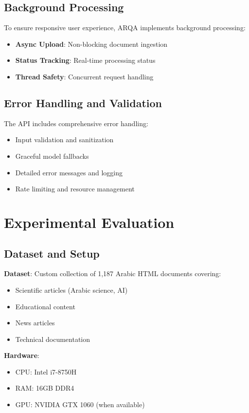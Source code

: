 \documentclass[conference]{IEEEtran}
\begin{document}
\subsection{Background Processing}
To ensure responsive user experience, ARQA implements background processing:
\begin{itemize}
    \item \textbf{Async Upload}: Non-blocking document ingestion
    \item \textbf{Status Tracking}: Real-time processing status
    \item \textbf{Thread Safety}: Concurrent request handling
\end{itemize}

\subsection{Error Handling and Validation}
The API includes comprehensive error handling:
\begin{itemize}
    \item Input validation and sanitization
    \item Graceful model fallbacks
    \item Detailed error messages and logging
    \item Rate limiting and resource management
\end{itemize}

\section{Experimental Evaluation}

\subsection{Dataset and Setup}
\textbf{Dataset}: Custom collection of 1,187 Arabic HTML documents covering:
\begin{itemize}
    \item Scientific articles (Arabic science, AI)
    \item Educational content
    \item News articles
    \item Technical documentation
\end{itemize}

\textbf{Hardware}: 
\begin{itemize}
    \item CPU: Intel i7-8750H
    \item RAM: 16GB DDR4
    \item GPU: NVIDIA GTX 1060 (when available)
\end{itemize}
\end{document}
